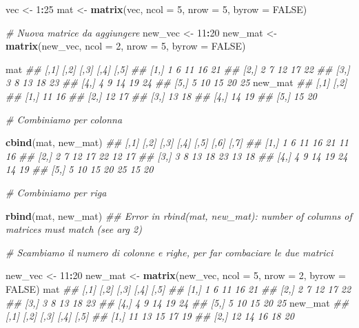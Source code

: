 \documentclass[
]{book}
\newenvironment{Shaded}{\begin{snugshade}}{\end{snugshade}}
\newcommand{\CommentTok}[1]{\textcolor[rgb]{0.56,0.35,0.01}{\textit{#1}}}
\newcommand{\DataTypeTok}[1]{\textcolor[rgb]{0.13,0.29,0.53}{#1}}
\newcommand{\DecValTok}[1]{\textcolor[rgb]{0.00,0.00,0.81}{#1}}
\newcommand{\KeywordTok}[1]{\textcolor[rgb]{0.13,0.29,0.53}{\textbf{#1}}}
\newcommand{\NormalTok}[1]{#1}
\newcommand{\OperatorTok}[1]{\textcolor[rgb]{0.81,0.36,0.00}{\textbf{#1}}}
\newcommand{\OtherTok}[1]{\textcolor[rgb]{0.56,0.35,0.01}{#1}}
\newcommand{\StringTok}[1]{\textcolor[rgb]{0.31,0.60,0.02}{#1}}
\begin{document}
\begin{Shaded}
\begin{Highlighting}[]
\NormalTok{vec <-}\StringTok{ }\DecValTok{1}\OperatorTok{:}\DecValTok{25}
\NormalTok{mat <-}\StringTok{ }\KeywordTok{matrix}\NormalTok{(vec, }\DataTypeTok{ncol =} \DecValTok{5}\NormalTok{, }\DataTypeTok{nrow =} \DecValTok{5}\NormalTok{, }\DataTypeTok{byrow =} \OtherTok{FALSE}\NormalTok{)}

\CommentTok{# Nuova matrice da aggiungere}
\NormalTok{new_vec <-}\StringTok{ }\DecValTok{11}\OperatorTok{:}\DecValTok{20}
\NormalTok{new_mat <-}\StringTok{ }\KeywordTok{matrix}\NormalTok{(new_vec, }\DataTypeTok{ncol =} \DecValTok{2}\NormalTok{, }\DataTypeTok{nrow =} \DecValTok{5}\NormalTok{, }\DataTypeTok{byrow =} \OtherTok{FALSE}\NormalTok{)}

\NormalTok{mat}
\CommentTok{##      [,1] [,2] [,3] [,4] [,5]}
\CommentTok{## [1,]    1    6   11   16   21}
\CommentTok{## [2,]    2    7   12   17   22}
\CommentTok{## [3,]    3    8   13   18   23}
\CommentTok{## [4,]    4    9   14   19   24}
\CommentTok{## [5,]    5   10   15   20   25}
\NormalTok{new_mat}
\CommentTok{##      [,1] [,2]}
\CommentTok{## [1,]   11   16}
\CommentTok{## [2,]   12   17}
\CommentTok{## [3,]   13   18}
\CommentTok{## [4,]   14   19}
\CommentTok{## [5,]   15   20}

\CommentTok{# Combiniamo per colonna}

\KeywordTok{cbind}\NormalTok{(mat, new_mat)}
\CommentTok{##      [,1] [,2] [,3] [,4] [,5] [,6] [,7]}
\CommentTok{## [1,]    1    6   11   16   21   11   16}
\CommentTok{## [2,]    2    7   12   17   22   12   17}
\CommentTok{## [3,]    3    8   13   18   23   13   18}
\CommentTok{## [4,]    4    9   14   19   24   14   19}
\CommentTok{## [5,]    5   10   15   20   25   15   20}

\CommentTok{# Combiniamo per riga}

\KeywordTok{rbind}\NormalTok{(mat, new_mat)}
\CommentTok{## Error in rbind(mat, new_mat): number of columns of matrices must match (see arg 2)}

\CommentTok{# Scambiamo il numero di colonne e righe, per far combaciare le due matrici}

\NormalTok{new_vec <-}\StringTok{ }\DecValTok{11}\OperatorTok{:}\DecValTok{20}
\NormalTok{new_mat <-}\StringTok{ }\KeywordTok{matrix}\NormalTok{(new_vec, }\DataTypeTok{ncol =} \DecValTok{5}\NormalTok{, }\DataTypeTok{nrow =} \DecValTok{2}\NormalTok{, }\DataTypeTok{byrow =} \OtherTok{FALSE}\NormalTok{)}
\NormalTok{mat}
\CommentTok{##      [,1] [,2] [,3] [,4] [,5]}
\CommentTok{## [1,]    1    6   11   16   21}
\CommentTok{## [2,]    2    7   12   17   22}
\CommentTok{## [3,]    3    8   13   18   23}
\CommentTok{## [4,]    4    9   14   19   24}
\CommentTok{## [5,]    5   10   15   20   25}
\NormalTok{new_mat}
\CommentTok{##      [,1] [,2] [,3] [,4] [,5]}
\CommentTok{## [1,]   11   13   15   17   19}
\CommentTok{## [2,]   12   14   16   18   20}


\end{Highlighting}
\end{Shaded}
\end{document}
